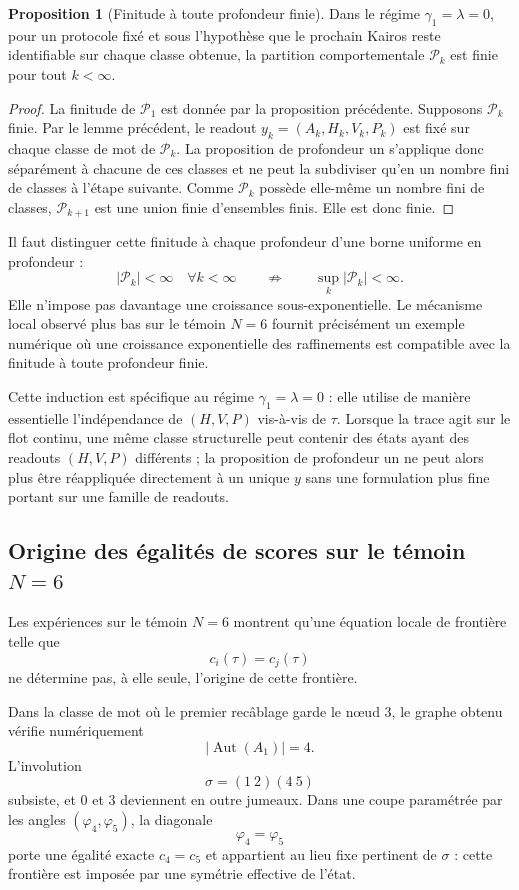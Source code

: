\documentclass[11pt,a4paper]{article}
\theoremstyle{definition}
\newtheorem{propositionthm}[definition]{Proposition}
\theoremstyle{remark}
\begin{document}
\begin{propositionthm}[Finitude à toute profondeur finie]
Dans le régime $\gamma_1=\lambda=0$, pour un protocole fixé et sous l'hypothèse que le prochain Kairos reste identifiable sur chaque classe obtenue, la partition comportementale $\mathcal P_k$ est finie pour tout $k<\infty$.
\end{propositionthm}

\begin{proof}
La finitude de $\mathcal P_1$ est donnée par la proposition précédente. Supposons $\mathcal P_k$ finie. Par le lemme précédent, le readout $y_k=(A_k,H_k,V_k,P_k)$ est fixé sur chaque classe de mot de $\mathcal P_k$. La proposition de profondeur un s'applique donc séparément à chacune de ces classes et ne peut la subdiviser qu'en un nombre fini de classes à l'étape suivante. Comme $\mathcal P_k$ possède elle-même un nombre fini de classes, $\mathcal P_{k+1}$ est une union finie d'ensembles finis. Elle est donc finie.
\end{proof}

Il faut distinguer cette finitude à chaque profondeur d'une borne uniforme en profondeur :
\[
|\mathcal P_k|<\infty\quad\forall k<\infty
\qquad\not\Rightarrow\qquad
\sup_k|\mathcal P_k|<\infty.
\]
Elle n'impose pas davantage une croissance sous-exponentielle. Le mécanisme local observé plus bas sur le témoin $N=6$ fournit précisément un exemple numérique où une croissance exponentielle des raffinements est compatible avec la finitude à toute profondeur finie.

Cette induction est spécifique au régime $\gamma_1=\lambda=0$ : elle utilise de manière essentielle l'indépendance de $(H,V,P)$ vis-à-vis de $\tau$. Lorsque la trace agit sur le flot continu, une même classe structurelle peut contenir des états ayant des readouts $(H,V,P)$ différents ; la proposition de profondeur un ne peut alors plus être réappliquée directement à un unique $y$ sans une formulation plus fine portant sur une famille de readouts.

\subsection{Origine des égalités de scores sur le témoin $N=6$}

Les expériences sur le témoin $N=6$ montrent qu'une équation locale de frontière telle que
\[
c_i(\tau)=c_j(\tau)
\]
ne détermine pas, à elle seule, l'origine de cette frontière.

Dans la classe de mot où le premier recâblage garde le nœud $3$, le graphe obtenu vérifie numériquement
\[
|\operatorname{Aut}(A_1)|=4.
\]
L'involution
\[
\sigma=(1\ 2)(4\ 5)
\]
subsiste, et $0$ et $3$ deviennent en outre jumeaux. Dans une coupe paramétrée par les angles $(\varphi_4,\varphi_5)$, la diagonale
\[
\varphi_4=\varphi_5
\]
porte une égalité exacte $c_4=c_5$ et appartient au lieu fixe pertinent de $\sigma$ : cette frontière est imposée par une symétrie effective de l'état.
\end{document}
